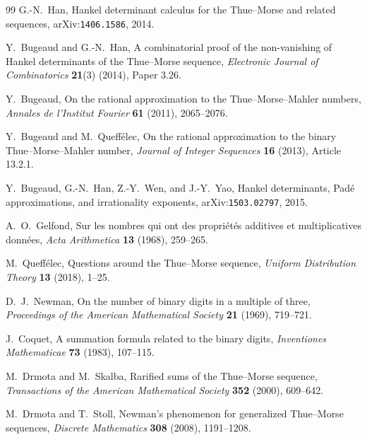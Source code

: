 \documentclass[11pt,oneside]{article}
\numberwithin{equation}{section}
\theoremstyle{definition}
\theoremstyle{remark}
\begin{document}
\begin{thebibliography}{99}
G.-N.~Han,
\newblock Hankel determinant calculus for the Thue--Morse and related
sequences,
\newblock arXiv:\nolinkurl{1406.1586}, 2014.

Y.~Bugeaud and G.-N.~Han,
\newblock A combinatorial proof of the non-vanishing of Hankel determinants
of the Thue--Morse sequence,
\newblock \emph{Electronic Journal of Combinatorics} \textbf{21}(3) (2014),
Paper 3.26.

Y.~Bugeaud,
\newblock On the rational approximation to the Thue--Morse--Mahler numbers,
\newblock \emph{Annales de l'Institut Fourier} \textbf{61} (2011),
2065--2076.

Y.~Bugeaud and M.~Queff\'elec,
\newblock On the rational approximation to the binary Thue--Morse--Mahler
number,
\newblock \emph{Journal of Integer Sequences} \textbf{16} (2013),
Article 13.2.1.

Y.~Bugeaud, G.-N.~Han, Z.-Y.~Wen, and J.-Y.~Yao,
\newblock Hankel determinants, Pad\'e approximations, and irrationality
exponents,
\newblock arXiv:\nolinkurl{1503.02797}, 2015.

A.~O.~Gelfond,
\newblock Sur les nombres qui ont des propri\'et\'es additives et
multiplicatives donn\'ees,
\newblock \emph{Acta Arithmetica} \textbf{13} (1968), 259--265.

M.~Queff\'elec,
\newblock Questions around the Thue--Morse sequence,
\newblock \emph{Uniform Distribution Theory} \textbf{13} (2018), 1--25.

D.~J.~Newman,
\newblock On the number of binary digits in a multiple of three,
\newblock \emph{Proceedings of the American Mathematical Society}
\textbf{21} (1969), 719--721.

J.~Coquet,
\newblock A summation formula related to the binary digits,
\newblock \emph{Inventiones Mathematicae} \textbf{73} (1983), 107--115.

M.~Drmota and M.~Skalba,
\newblock Rarified sums of the Thue--Morse sequence,
\newblock \emph{Transactions of the American Mathematical Society}
\textbf{352} (2000), 609--642.

M.~Drmota and T.~Stoll,
\newblock Newman's phenomenon for generalized Thue--Morse sequences,
\newblock \emph{Discrete Mathematics} \textbf{308} (2008), 1191--1208.


\end{thebibliography}
\end{document}
